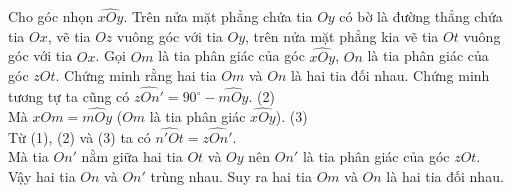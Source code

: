 \begin{vn}%
Cho góc nhọn $ \widehat{xOy} $. Trên nửa mặt phẳng chứa tia $ Oy $ có bờ là đường thẳng chứa tia $ Ox $, vẽ tia $ Oz $ vuông góc với tia $ Oy $, trên nửa mặt phẳng kia vẽ tia $ Ot $ vuông góc với tia $ Ox $. Gọi $ Om $ là tia phân giác của góc $ \widehat{xOy} $, $ On $ là tia phân giác của góc $ zOt$. Chứng minh rằng hai tia $ Om $ và $ On $ là hai tia đối nhau.
	\loigiai
	{
	Chứng minh tương tự ta cũng có $ \widehat{zOn'}=90^\circ-\widehat{mOy} $. \hfill (2)\\
	Mà $ \widehat{xOm}=\widehat{mOy} $ ($ Om $ là tia phân giác $ \widehat{xOy} $). \hfill (3)\\
	Từ (1), (2) và (3) ta có $ \widehat{n'Ot}=\widehat{zOn'} $.\\
	Mà tia $ On' $ nằm giữa hai tia $ Ot$ và $ Oy $ nên $ On' $ là tia phân giác của góc $ zOt $.\\
	Vậy hai tia $ On $ và $ On' $ trùng nhau. Suy ra hai tia $ Om $ và $ On $  là hai tia đối nhau.
	}
\end{vn}







